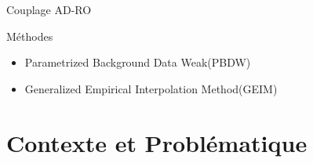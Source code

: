 \documentclass[a4paper,10pt]{beamer}
\numberwithin{equation}{section}
\begin{document}
\begin{frame}{\sc Couplage AD-RO}
\begin{block}{\sc Méthodes}
	\pause
	\begin{itemize}[<+->]
		\item Parametrized Background Data Weak(PBDW)
		\item Generalized Empirical Interpolation Method(GEIM)
	\end{itemize}
\end{block}
\end{frame}
\section{\sc Contexte et Problématique}

\end{document}
